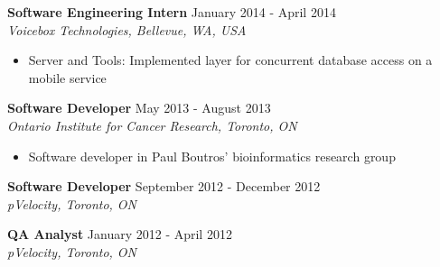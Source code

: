 \documentclass[10pt]{res} %
\begin{document}
\textbf{Software Engineering Intern} \hfill January 2014 - April 2014 \\[2pt]
{\sl Voicebox Technologies, Bellevue, WA, USA} 
\begin{itemize}  %
    \item Server and Tools: Implemented layer for concurrent database access on a mobile service
\end{itemize}

\textbf{Software Developer} \hfill May 2013 - August 2013 \\[2pt]
{\sl Ontario Institute for Cancer Research, Toronto, ON} 
\begin{itemize}  %
    \item Software developer in Paul Boutros' bioinformatics research group
\end{itemize}

\textbf{Software Developer} \hfill September 2012 - December 2012 \\[2pt]
{\sl pVelocity, Toronto, ON} 

\textbf{QA Analyst} \hfill January 2012 - April 2012 \\[2pt]
{\sl pVelocity, Toronto, ON} 


\end{document}
